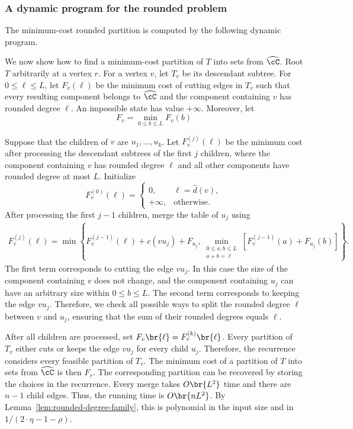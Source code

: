 \subsubsection{A dynamic program for the rounded problem}

The minimum-cost rounded partition is computed by the following dynamic program.



We now show how to find a minimum-cost partition of $T$ into sets from $\widehat\cC$. Root $T$ arbitrarily at a vertex $r$. For a vertex $v$, let $T_v$ be its descendant subtree. For $0\leq\ell\leq L$, let $F_v(\ell)$ be the minimum cost of cutting edges in $T_v$ such that every resulting component belongs to $\widehat\cC$ and the component containing $v$ has rounded degree $\ell$. An impossible state has value $+\infty$. Moreover, let
\[
    F_v=\min_{0\leq b\leq L}F_{v}(b)
\]

Suppose that the children of $v$ are $u_1,\ldots,u_k$. Let $F_v^{(j)}(\ell)$ be the minimum cost after processing the descendant subtrees of the first $j$ children, where the component containing $v$ has rounded degree $\ell$ and all other components have rounded degree at most $L$. Initialize
\[
    F_v^{(0)}(\ell)
    =\begin{cases}
        0,&\ell=\widehat d(v),\\
        +\infty,&\text{otherwise}.
    \end{cases}
\]
After processing the first $j-1$ children, merge the table of $u_j$ using
\begin{align*}
    F_v^{(j)}(\ell)
    =\min\left\{
        F_v^{(j-1)}(\ell)+c(vu_j)+F_{u_j},
        \min_{\substack{0\leq a,b\leq L\\a+b=\ell}}
        \left[
            F_v^{(j-1)}(a)+F_{u_j}(b)
        \right]
    \right\}.
\end{align*}
The first term corresponds to cutting the edge $vu_j$. In this case the size of the component containing $v$ does not change, and the component containing $u_j$ can have an arbitrary size within $0\leq b\leq L$.
The second term corresponds to keeping the edge $vu_j$. Therefore, we check all possible ways to split the rounded degree $\ell$ between $v$ and $u_j$, ensuring that the sum of their rounded degrees equals $\ell$.

After all children are processed, set $F_v\br{\ell}=F_v^{(k)}\br{\ell}$. Every partition of $T_v$ either cuts or keeps the edge $vu_j$ for every child $u_j$. Therefore, the recurrence considers every feasible partition of $T_v$. The minimum cost of a partition of $T$ into sets from $\widehat\cC$ is then $F_r$.
The corresponding partition can be recovered by storing the choices in the recurrence. Every merge takes $O\br{L^2}$ time and there are $n-1$ child edges. Thus, the running time is $O\br{nL^2}$. By Lemma~\ref{lem:rounded-degree-family}, this is polynomial in the input size and in $1/(2\cdot\eta-1-\rho)$.

